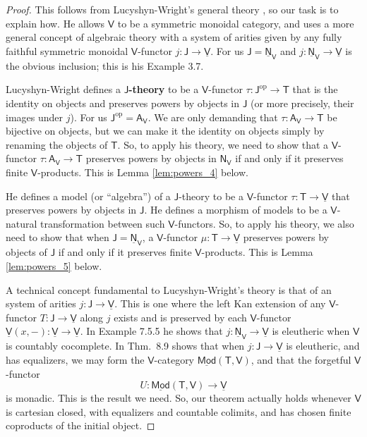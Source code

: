 \documentclass{amsart}
\newcommand{\define}[1]{{\bf \boldmath{#1}}}
\theoremstyle{definition}
\newcommand{\Mod}{\mathsf{Mod}}
\newcommand{\NN}{\mathsf{N}}
\newcommand{\A}{\mathsf{A}}
\newcommand{\V}{\mathsf{V}}
\newcommand{\J}{\mathsf{J}}
\newcommand{\T}{\mathsf{T}}
\newcommand{\op}{\mathrm{op}}
\newcommand{\maps}{\colon}
\begin{document}
\begin{proof}
This follows from Lucyshyn-Wright's general theory \cite{lucyshyn-wright}, so our task is
to explain how.   He allows $\V$ to be a symmetric monoidal category, and uses a more general concept of algebraic theory with a system of arities given by any fully faithful symmetric monoidal $\V$-functor $j \maps \J \to \underline{\V}$.   For us $\J = \underline{\NN}_\V$ and $j \maps \underline{\NN}_\V \to \underline{\V}$ is the obvious inclusion; this is his Example 3.7.

Lucyshyn-Wright defines a \textbf{$\J$-theory} to be a $\V$-functor $\tau \maps \J^\op \to \T$ that is the identity on objects and preserves powers by objects in $\J$ (or more precisely, their images under $j$).  For us $\J^\op = \A_\V$.   We are only demanding that $\tau \maps \A_\V \to \T$ be bijective on objects, but we can make it the identity on objects simply by renaming the objects of $\T$.  So, to apply his theory, we need to show that a $\V$-functor $\tau \maps \A_\V \to \T$ preserves powers by objects in $\NN_\V$ if and only if it preserves finite $\V$-products.
This is Lemma \ref{lem:powers_4} below.

He defines a model (or ``algebra'') of a $\J$-theory to be a $\V$-functor $\tau \maps \T \to \underline{\V}$ that preserves powers by objects in $\J$.   He defines a morphism of models to be 
a $\V$-natural transformation between such $\V$-functors.  So, to apply his theory, we also
need to show that when $\J = \underline{\NN}_\V$, a $\V$-functor $\mu \maps \T \to \underline{\V}$ preserves powers by objects of $\J$ if and only if it preserves finite
$\V$-products.   This is Lemma \ref{lem:powers_5} below.

A technical concept fundamental to Lucyshyn-Wright's theory is that of an \define{eleutheric} system of arities $j \maps \J \to \underline{\V}$.  This is one where the left Kan extension of any $\V$-functor $T \maps \J \to \underline{\V}$ along $j$ exists and is preserved by each $\V$-functor
$\underline{\V}(x,-) \maps \underline{\V} \to \underline{\V}$.  In Example 7.5.5 he shows
that $j \maps \underline{\NN}_\V \to \underline{\V}$ is eleutheric when $\V$ is 
countably cocomplete.  In Thm.\ 8.9 shows that when $j \maps \J \to \underline{\V}$ is eleutheric, and has equalizers, we may form the $\V$-category $\underline{\Mod}(\T,\V)$, and that the forgetful $\V$-functor
\[   U \maps \underline{\Mod}(\T,\V) \to \underline{\V} \]
is monadic.  This is the result we need.   So, our theorem actually holds whenever $\V$ is cartesian closed, with equalizers and countable colimits, and has chosen finite coproducts of the initial object.  \end{proof}
\end{document}
